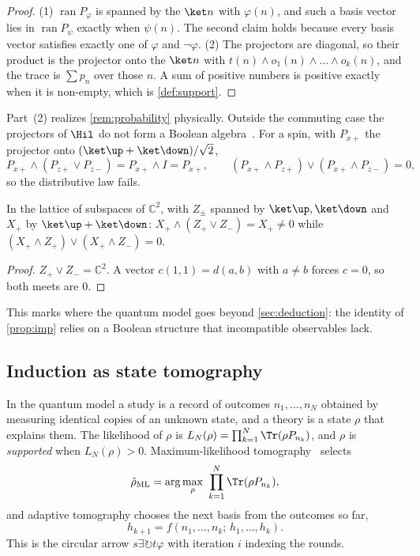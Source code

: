 \begin{proof}
(1) $\operatorname{ran}P_\varphi$ is spanned by the $\ket n$ with $\varphi(n)$, and such a basis vector
lies in $\operatorname{ran}P_\psi$ exactly when $\psi(n)$. The second claim holds because every
basis vector satisfies exactly one of $\varphi$ and $\neg\varphi$.
(2) The projectors are diagonal, so their product is the projector onto the $\ket n$ with
$t(n)\wedge o_1(n)\wedge\dots\wedge o_k(n)$, and the trace is $\sum p_n$ over those $n$. A sum of
positive numbers is positive exactly when it is non-empty, which is \cref{def:support}.
\end{proof}

Part~(2) realizes \cref{rem:probability} physically. Outside the commuting case the projectors
of $\Hil$ do not form a Boolean algebra~\cite{birkhoff,vonneumann}. For a spin, with $P_{x+}$ the
projector onto $(\ket\up+\ket\down)/\sqrt2$,
\[
  P_{x+}\wedge(P_{z+}\vee P_{z-})=P_{x+}\wedge I=P_{x+},
  \qquad
  (P_{x+}\wedge P_{z+})\vee(P_{x+}\wedge P_{z-})=0,
\]
so the distributive law fails.

\begin{proposition}\label{prop:nondistrib}
In the lattice of subspaces of $\mathbb C^2$, with $Z_\pm$ spanned by $\ket\up,\ket\down$ and $X_+$
by $\ket\up+\ket\down$: $X_+\wedge(Z_+\vee Z_-)=X_+\ne0$ while
$(X_+\wedge Z_+)\vee(X_+\wedge Z_-)=0$.
\end{proposition}

\begin{proof}
$Z_+\vee Z_-=\mathbb C^2$. A vector $c(1,1)=d(a,b)$ with $a\ne b$ forces $c=0$, so both meets are $0$.
\end{proof}

This marks where the quantum model goes beyond
\cref{sec:deduction}: the identity of \cref{prop:imp} relies on a Boolean structure that
incompatible observables lack.

\subsection{Induction as state tomography}

In the quantum model a study is a record of outcomes $n_1,\dots,n_N$ obtained by measuring
identical copies of an unknown state, and a theory is a state $\rho$ that explains them. The
likelihood of $\rho$ is $L_N(\rho)=\prod_{k=1}^N\Tr(\rho P_{n_k})$, and $\rho$ is \emph{supported}
when $L_N(\rho)>0$. Maximum-likelihood tomography~\cite{hradil} selects
\[
  \hat\rho_{\mathrm{ML}}=\arg\max_\rho\ \prod_{k=1}^N\Tr(\rho P_{n_k}),
\]
and adaptive tomography chooses the next basis from the outcomes so far,
\[
  h_{k+1}=f(n_1,\dots,n_k;\,h_1,\dots,h_k).
\]
This is the circular arrow $s\exists\circlearrowright
t\varphi$ with iteration $i$ indexing the rounds.

